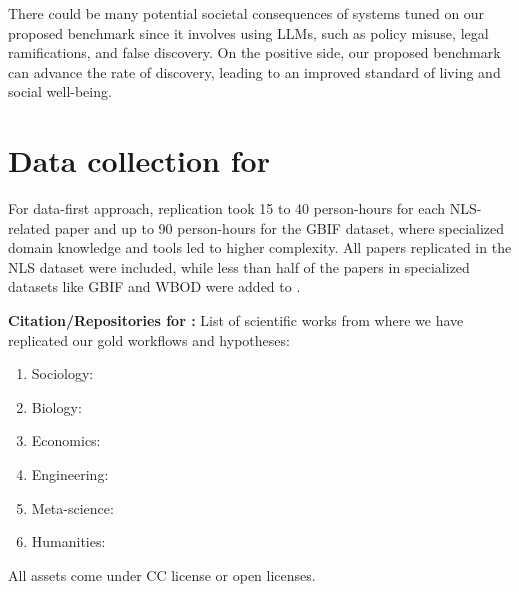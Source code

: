  There could be many potential societal consequences of systems tuned on our proposed benchmark since it involves using LLMs, such as policy misuse, legal ramifications, and false discovery. On the positive side, our proposed benchmark can advance the rate of discovery, leading to an improved standard of living and social well-being.


\section{Data collection for \real{}}
\label{sec:real}
For data-first approach, replication took 15 to 40 person-hours for each NLS-related paper and up to 90 person-hours
for the GBIF dataset, where specialized domain knowledge and tools led to higher complexity. All papers replicated in the NLS dataset were included, while less than half of the papers in specialized datasets like GBIF and WBOD were added to \discoverybench{}. 

\textbf{Citation/Repositories for \real{}:}
List of scientific works from where we have replicated our gold workflows and hypotheses:
\begin{enumerate}
    \item Sociology: \cite{zaw2016race,apel2010impact,alexander1982social, smith2005time,dougherty2003numeracy}
    \item Biology: \cite{cerezer2023accelerated, riera2024effect}
    \item Economics: \cite{pal2023impact,appiah2017effect,weatherly2022impact,rambeli2021dynamic,ottaviano2013immigration}
    \item Engineering: \cite{alves2023status}
    \item Meta-science: \cite{heyard2024meta}
    \item Humanities: \cite{brozio2024patterns,brozio2019monuments,lorenz2018kommunikationsstrukturen,maida2023unter,sommerfeld2013gerategeld,feeser2019human,parkinson2021radiocarbon,kneisel2021chronology,kaiser2021time,brinkmann2019copper,dal2019s,palmisano2021long,parkinson2021radiocarbon}
\end{enumerate}
All assets come under CC license or open licenses. 


